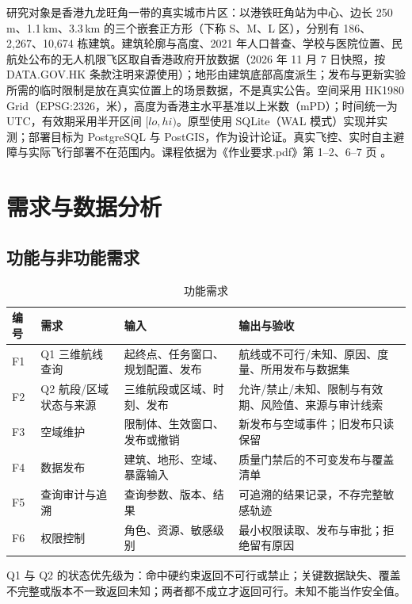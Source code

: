 \documentclass[a4paper,11pt,UTF8]{ctexart}
\begin{document}
研究对象是香港九龙旺角一带的真实城市片区：以港铁旺角站为中心、边长 250\,m、1.1\,km、3.3\,km 的三个嵌套正方形（下称 S、M、L 区），分别有 186、2,267、10,674 栋建筑。建筑轮廓与高度、2021 年人口普查、学校与医院位置、民航处公布的无人机限飞区取自香港政府开放数据（2026 年 11 月 7 日快照，按 DATA.GOV.HK 条款注明来源使用）\cite{hk-bldg,hk-census,hk-rfz,hk-poi}；地形由建筑底部高度派生；发布与更新实验所需的临时限制是放在真实位置上的场景数据，不是真实公告。空间采用 HK1980 Grid（EPSG:2326，米），高度为香港主水平基准以上米数（mPD）；时间统一为 UTC，有效期采用半开区间 $[\mathit{lo},\mathit{hi})$。原型使用 SQLite（WAL 模式）实现并实测；部署目标为 PostgreSQL 与 PostGIS，作为设计论证。真实飞控、实时自主避障与实际飞行部署不在范围内。课程依据为《作业要求.pdf》第 1–2、6–7 页 \cite{course}。

\section{需求与数据分析}\label{sec:req}

\subsection{功能与非功能需求}

\begin{table}[!htbp]\centering\small
\caption{功能需求}
\begin{tabularx}{\textwidth}{L{0.7cm}L{2.6cm}YY}
\toprule
编号 & 需求 & 输入 & 输出与验收 \\
\midrule
F1 & Q1 三维航线查询 & 起终点、任务窗口、规划配置、发布 & 航线或不可行/未知、原因、度量、所用发布与数据集 \\
F2 & Q2 航段/区域状态与来源 & 三维航段或区域、时刻、发布 & 允许/禁止/未知、限制与有效期、风险值、来源与审计线索 \\
F3 & 空域维护 & 限制体、生效窗口、发布或撤销 & 新发布与空域事件；旧发布只读保留 \\
F4 & 数据发布 & 建筑、地形、空域、暴露输入 & 质量门禁后的不可变发布与覆盖清单 \\
F5 & 查询审计与追溯 & 查询参数、版本、结果 & 可追溯的结果记录，不存完整敏感轨迹 \\
F6 & 权限控制 & 角色、资源、敏感级别 & 最小权限读取、发布与审批；拒绝留有原因 \\
\bottomrule
\end{tabularx}
\end{table}

Q1 与 Q2 的状态优先级为：命中硬约束返回不可行或禁止；关键数据缺失、覆盖不完整或版本不一致返回未知；两者都不成立才返回可行。未知不能当作安全值。
\end{document}
